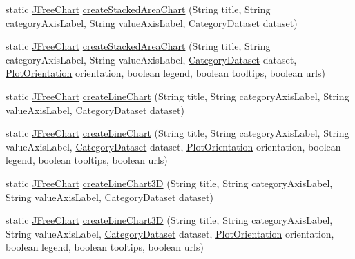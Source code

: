 \begin{DoxyCompactItemize}
\item 
static \mbox{\hyperlink{classorg_1_1jfree_1_1chart_1_1_j_free_chart}{J\+Free\+Chart}} \mbox{\hyperlink{classorg_1_1jfree_1_1chart_1_1_chart_factory_a1d0842953c7ca4021edbd7c73b547496}{create\+Stacked\+Area\+Chart}} (String title, String category\+Axis\+Label, String value\+Axis\+Label, \mbox{\hyperlink{interfaceorg_1_1jfree_1_1data_1_1category_1_1_category_dataset}{Category\+Dataset}} dataset)
\item 
static \mbox{\hyperlink{classorg_1_1jfree_1_1chart_1_1_j_free_chart}{J\+Free\+Chart}} \mbox{\hyperlink{classorg_1_1jfree_1_1chart_1_1_chart_factory_a3365f742788e54e6c57c202eec2293b3}{create\+Stacked\+Area\+Chart}} (String title, String category\+Axis\+Label, String value\+Axis\+Label, \mbox{\hyperlink{interfaceorg_1_1jfree_1_1data_1_1category_1_1_category_dataset}{Category\+Dataset}} dataset, \mbox{\hyperlink{classorg_1_1jfree_1_1chart_1_1plot_1_1_plot_orientation}{Plot\+Orientation}} orientation, boolean legend, boolean tooltips, boolean urls)
\item 
static \mbox{\hyperlink{classorg_1_1jfree_1_1chart_1_1_j_free_chart}{J\+Free\+Chart}} \mbox{\hyperlink{classorg_1_1jfree_1_1chart_1_1_chart_factory_a388c818d4d295ede93a147223308ae83}{create\+Line\+Chart}} (String title, String category\+Axis\+Label, String value\+Axis\+Label, \mbox{\hyperlink{interfaceorg_1_1jfree_1_1data_1_1category_1_1_category_dataset}{Category\+Dataset}} dataset)
\item 
static \mbox{\hyperlink{classorg_1_1jfree_1_1chart_1_1_j_free_chart}{J\+Free\+Chart}} \mbox{\hyperlink{classorg_1_1jfree_1_1chart_1_1_chart_factory_a80263d72fc6a9c518a6c27a528cce16f}{create\+Line\+Chart}} (String title, String category\+Axis\+Label, String value\+Axis\+Label, \mbox{\hyperlink{interfaceorg_1_1jfree_1_1data_1_1category_1_1_category_dataset}{Category\+Dataset}} dataset, \mbox{\hyperlink{classorg_1_1jfree_1_1chart_1_1plot_1_1_plot_orientation}{Plot\+Orientation}} orientation, boolean legend, boolean tooltips, boolean urls)
\item 
static \mbox{\hyperlink{classorg_1_1jfree_1_1chart_1_1_j_free_chart}{J\+Free\+Chart}} \mbox{\hyperlink{classorg_1_1jfree_1_1chart_1_1_chart_factory_a8f78a814703208dde47c02bd11598ca5}{create\+Line\+Chart3D}} (String title, String category\+Axis\+Label, String value\+Axis\+Label, \mbox{\hyperlink{interfaceorg_1_1jfree_1_1data_1_1category_1_1_category_dataset}{Category\+Dataset}} dataset)
\item 
static \mbox{\hyperlink{classorg_1_1jfree_1_1chart_1_1_j_free_chart}{J\+Free\+Chart}} \mbox{\hyperlink{classorg_1_1jfree_1_1chart_1_1_chart_factory_a7913048e1cb34b6ac0154d0d6a68cf38}{create\+Line\+Chart3D}} (String title, String category\+Axis\+Label, String value\+Axis\+Label, \mbox{\hyperlink{interfaceorg_1_1jfree_1_1data_1_1category_1_1_category_dataset}{Category\+Dataset}} dataset, \mbox{\hyperlink{classorg_1_1jfree_1_1chart_1_1plot_1_1_plot_orientation}{Plot\+Orientation}} orientation, boolean legend, boolean tooltips, boolean urls)

\end{DoxyCompactItemize}
